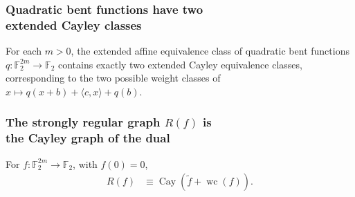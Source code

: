 \documentclass[pdf,sprung,slideColor,nocolorBG]{beamer}
\newenvironment{colortheme}[1]{
\def\ProvidesPackageRCS $##1${\relax}
\renewcommand{\ProcessOptions}{\relax}
\makeatletter

\makeatother
}{}
\newcommand{\mb}[1]{\mathbb{#1}}
\newcommand{\To}{\rightarrow}
\newcommand{\Cay}[1]{\operatorname{Cay}\left(#1\right)}
\newcommand{\dual}[1]{\widetilde{#1}}
\newcommand{\weightclass}[1]{\operatorname{wc}\left(#1\right)}
\newcommand{\F}{\mb{F}}
\begin{document}
\begin{colortheme}{jubata}
\begin{frame}
\frametitle{Quadratic bent functions have two \\ extended Cayley classes}
\begin{Theorem}
For each $m>0$, the extended affine equivalence class of quadratic bent functions
$q : \F_2^{2m} \To \F_2$ contains exactly two extended Cayley equivalence classes,
corresponding to the two possible weight classes of $x \mapsto q(x+b) + \langle c, x \rangle + q(b)$.
\end{Theorem}

\end{frame}


\begin{frame}
\frametitle{The strongly regular graph $R(f)$ is \\ the Cayley graph of the dual}

\begin{Theorem}
For $f : \F_2^{2m} \To \F_2$, with $f(0)=0$,
\begin{align*}
R(f) &\equiv \Cay{\dual{f} + \weightclass{f}}.
\end{align*}
\end{Theorem}

\end{frame}

\end{colortheme}

\end{document}
